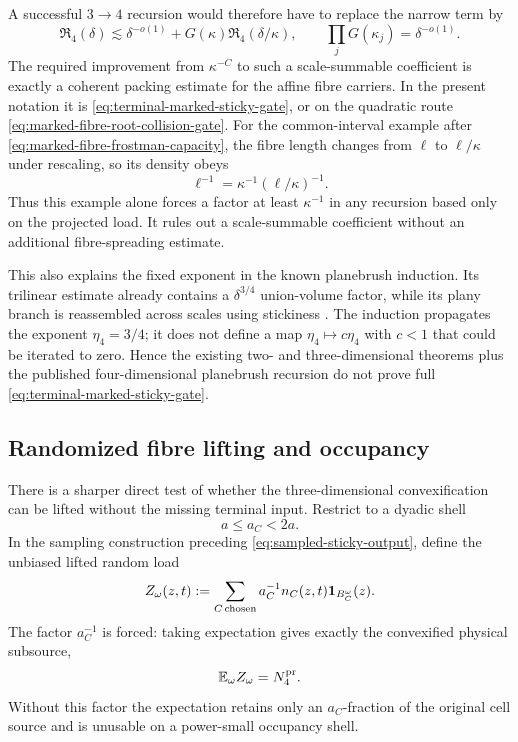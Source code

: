 \documentclass[11pt]{article}
\begin{document}
A successful \(3\to4\) recursion would therefore have to replace the
narrow term by
\begin{equation}\label{eq:contractive-marked-fibre-recursion}
 \mathfrak R_4(\delta)
 \lesssim\delta^{-o(1)}
 +G(\kappa)\mathfrak R_4(\delta/\kappa),
 \qquad
 \prod_jG(\kappa_j)=\delta^{-o(1)}.
\end{equation}
The required improvement from \(\kappa^{-C}\) to such a
scale-summable coefficient is exactly a coherent packing estimate for the
affine fibre carriers.  In the present notation it is
\eqref{eq:terminal-marked-sticky-gate}, or on the quadratic route
\eqref{eq:marked-fibre-root-collision-gate}.  For the common-interval
example after \eqref{eq:marked-fibre-frostman-capacity}, the fibre length
changes from \(\ell\) to \(\ell/\kappa\) under rescaling, so its
density obeys
\[
 \ell^{-1}=\kappa^{-1}(\ell/\kappa)^{-1}.
\]
Thus this example alone forces a factor at least \(\kappa^{-1}\) in any
recursion based only on the projected load.  It rules out a scale-summable
coefficient without an additional fibre-spreading estimate.

This also explains the fixed exponent in the known planebrush induction.
Its trilinear estimate already contains a \(\delta^{3/4}\) union-volume
factor, while its plany branch is reassembled across scales using stickiness
\cite{ChoudhuriSticky4D}.  The induction propagates the exponent
\(\eta_4=3/4\); it does not define a map
\(\eta_4\mapsto c\eta_4\) with \(c<1\) that could be iterated to
zero.  Hence the existing two- and three-dimensional theorems plus the
published four-dimensional planebrush recursion do not prove full
\eqref{eq:terminal-marked-sticky-gate}.

\subsection{Randomized fibre lifting and occupancy}

There is a sharper direct test of whether the three-dimensional convexification
can be lifted without the missing terminal input.  Restrict to a dyadic shell
\begin{equation}\label{eq:occupancy-weight-shell}
 a\le a_C<2a.
\end{equation}
In the sampling construction preceding
\eqref{eq:sampled-sticky-output}, define the unbiased lifted random load
\begin{equation}\label{eq:unbiased-random-fibre-lift}
 Z_\omega(z,t)
 :=\sum_{C\,\mathrm{chosen}}
     a_C^{-1}n_C(z,t){\bf1}_{B_C^\omega}(z).
\end{equation}
The factor \(a_C^{-1}\) is forced: taking expectation gives exactly the
convexified physical subsource,
\begin{equation}\label{eq:unbiased-random-fibre-expectation}
 \mathbb E_\omega Z_\omega=N_4^{\rm pr}.
\end{equation}
Without this factor the expectation retains only an \(a_C\)-fraction of
the original cell source and is unusable on a power-small occupancy shell.
\end{document}
